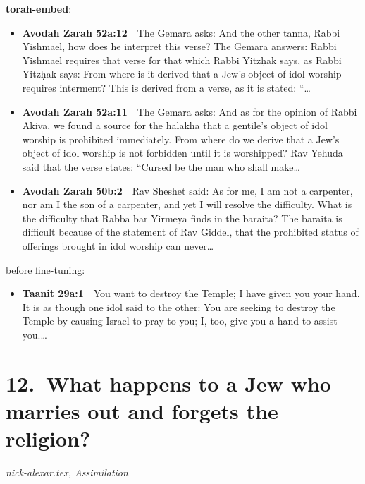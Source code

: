 \documentclass[11pt,a4paper]{article}
\begin{document}
{\color{quiet}\small\textbf{torah-embed}:}
\begin{itemize}[leftmargin=1.2em,itemsep=3pt]
\item {\color{ref}\textbf{Avodah Zarah 52a:12}}\ \ The Gemara asks: And the other tanna, Rabbi Yishmael, how does he interpret this verse? The Gemara answers: Rabbi Yishmael requires that verse for that which Rabbi Yitzḥak says, as Rabbi Yitzḥak says: From where is it derived that a Jew’s object of idol worship requires interment? This is derived from a verse, as it is stated: “\ldots
\item {\color{ref}\textbf{Avodah Zarah 52a:11}}\ \ The Gemara asks: And as for the opinion of Rabbi Akiva, we found a source for the halakha that a gentile’s object of idol worship is prohibited immediately. From where do we derive that a Jew’s object of idol worship is not forbidden until it is worshipped? Rav Yehuda said that the verse states: “Cursed be the man who shall make\ldots
\item {\color{ref}\textbf{Avodah Zarah 50b:2}}\ \ Rav Sheshet said: As for me, I am not a carpenter, nor am I the son of a carpenter, and yet I will resolve the difficulty. What is the difficulty that Rabba bar Yirmeya finds in the baraita? The baraita is difficult because of the statement of Rav Giddel, that the prohibited status of offerings brought in idol worship can never\ldots
\end{itemize}
{\color{quiet}\small before fine-tuning:}
\begin{itemize}[leftmargin=1.2em]
\item {\color{ref}\textbf{Taanit 29a:1}}\ \ You want to destroy the Temple; I have given you your hand. It is as though one idol said to the other: You are seeking to destroy the Temple by causing Israel to pray to you; I, too, give you a hand to assist you.\ldots
\end{itemize}

\section*{12.\ What happens to a Jew who marries out and forgets the religion?}
{\color{quiet}\small\textit{nick-alexar.tex, Assimilation}}
\end{document}
